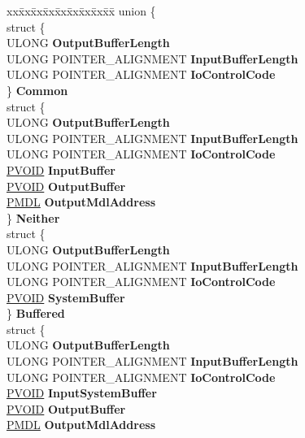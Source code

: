\begin{DoxyCompactItemize}
\begin{tabbing}
\end{tabbing}\item 
\mbox{\label{union___f_l_t___p_a_r_a_m_e_t_e_r_s_a1832056b794bf31bd242cfa3fad52618}} 
\begin{tabbing}
xx\=xx\=xx\=xx\=xx\=xx\=xx\=xx\=xx\=\kill
union \{\\
\>struct \{\\
\>\>ULONG {\bfseries OutputBufferLength}\\
\>\>ULONG POINTER\_ALIGNMENT {\bfseries InputBufferLength}\\
\>\>ULONG POINTER\_ALIGNMENT {\bfseries IoControlCode}\\
\>\} {\bfseries Common}\\
\>struct \{\\
\>\>ULONG {\bfseries OutputBufferLength}\\
\>\>ULONG POINTER\_ALIGNMENT {\bfseries InputBufferLength}\\
\>\>ULONG POINTER\_ALIGNMENT {\bfseries IoControlCode}\\
\>\>\hyperlink{interfacevoid}{PVOID} {\bfseries InputBuffer}\\
\>\>\hyperlink{interfacevoid}{PVOID} {\bfseries OutputBuffer}\\
\>\>\hyperlink{interfacevoid}{PMDL} {\bfseries OutputMdlAddress}\\
\>\} {\bfseries Neither}\\
\>struct \{\\
\>\>ULONG {\bfseries OutputBufferLength}\\
\>\>ULONG POINTER\_ALIGNMENT {\bfseries InputBufferLength}\\
\>\>ULONG POINTER\_ALIGNMENT {\bfseries IoControlCode}\\
\>\>\hyperlink{interfacevoid}{PVOID} {\bfseries SystemBuffer}\\
\>\} {\bfseries Buffered}\\
\>struct \{\\
\>\>ULONG {\bfseries OutputBufferLength}\\
\>\>ULONG POINTER\_ALIGNMENT {\bfseries InputBufferLength}\\
\>\>ULONG POINTER\_ALIGNMENT {\bfseries IoControlCode}\\
\>\>\hyperlink{interfacevoid}{PVOID} {\bfseries InputSystemBuffer}\\
\>\>\hyperlink{interfacevoid}{PVOID} {\bfseries OutputBuffer}\\
\>\>\hyperlink{interfacevoid}{PMDL} {\bfseries OutputMdlAddress}\\

\end{tabbing}
\end{DoxyCompactItemize}

